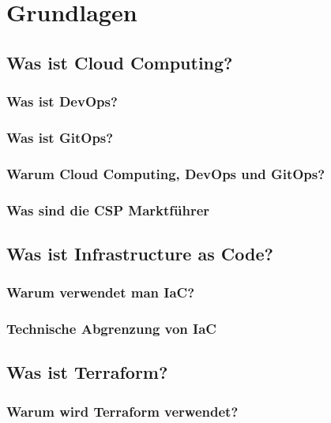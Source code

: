 
\chapter{Grundlagen}
\label{sec:grundl}

\section{Was ist Cloud Computing?}

\subsection{Was ist DevOps?}

\subsection{Was ist GitOps?}

\subsection{Warum Cloud Computing, DevOps und GitOps?}

\subsection{Was sind die CSP Marktführer}

\section{Was ist Infrastructure as Code?}

\subsection{Warum verwendet man IaC?}

\subsection{Technische Abgrenzung von IaC}

\section{Was ist Terraform?}

\subsection{Warum wird Terraform verwendet?}

